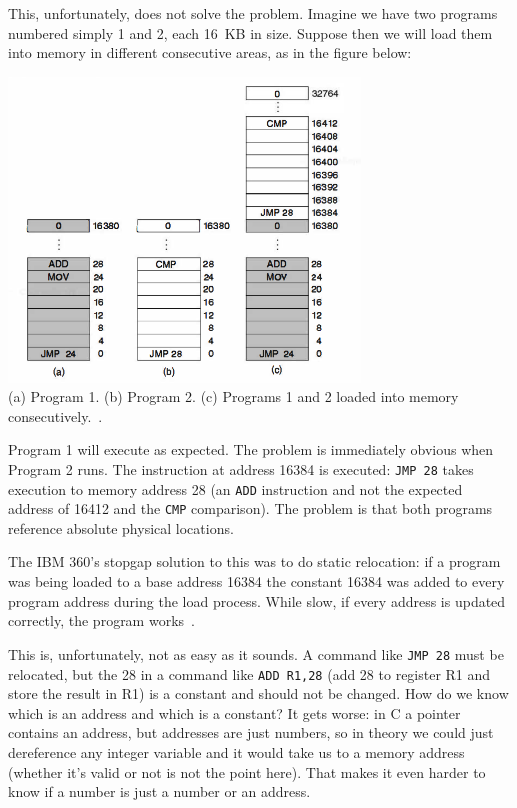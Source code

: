 This, unfortunately, does not solve the problem. Imagine we have two programs numbered simply 1 and 2, each 16~KB in size. Suppose then we will load them into memory in different consecutive areas, as in the figure below:

\begin{center}
\includegraphics[width=0.70\textwidth]{images/os360.png}\\
(a) Program 1. (b) Program 2. (c) Programs 1 and 2 loaded into memory consecutively.~\cite{mos}.
\end{center}

Program 1 will execute as expected. The problem is immediately obvious when Program 2 runs. The instruction at address 16384 is executed: \texttt{JMP 28} takes execution to memory address 28 (an \texttt{ADD} instruction and not the expected address of 16412 and the \texttt{CMP} comparison). The problem is that both programs reference absolute physical locations. 

The IBM 360's stopgap solution to this was to do static relocation: if a program was being loaded to a base address 16384 the constant 16384 was added to every program address during the load process. While slow, if every address is updated correctly, the program works~\cite{mos}.

This is, unfortunately, not as easy as it sounds. A command like \texttt{JMP 28} must be relocated, but the 28 in a command like \texttt{ADD R1,28} (add 28 to register R1 and store the result in R1) is a constant and should not be changed. How do we know which is an address and which is a constant? It gets worse: in C a pointer contains an address, but addresses are just numbers, so in theory we could just dereference any integer variable and it would take us to a memory address (whether it's valid or not is not the point here). That makes it even harder to know if a number is just a number or an address.

